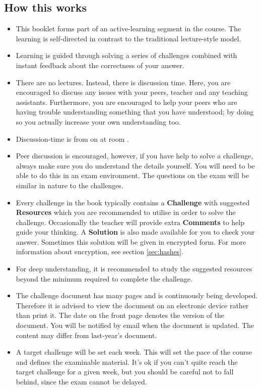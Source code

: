 \subsection{How this works}
\begin{itemize}
    \item This booklet forms part of an active-learning segment in the course. The learning is self-directed in contrast to the traditional lecture-style model.
    \item Learning is guided through solving a series of challenges combined with instant feedback about the correctness of your answer.
    \item There are no lectures. Instead, there is discussion time. Here, you are encouraged to discuss any issues with your peers, teacher and any teaching assistants. Furthermore, you are encouraged to help your peers who are having trouble understanding something that you have understood; by doing so you actually increase your own understanding too.
    \item Discussion-time is from \disctime on \discdays at room \discroom.
    \item Peer discussion is encouraged, however, if you have help to solve a challenge, always make sure you do understand the details yourself. You will need to be able to do this in an exam environment. The questions on the exam will be similar in nature to the challenges.
    \item Every challenge in the book typically contains a \textbf{Challenge} with suggested \textbf{Resources} which you are recommended to utilise in order to solve the challenge. Occasionally the teacher will provide extra \textbf{Comments} to help guide your thinking. A \textbf{Solution} is also made available for you to check your answer. Sometimes this solution will be given in encrypted form. For more information about encryption, see section \ref{sec:hashes}.
    \item For deep understanding, it is recommended to study the suggested resources beyond the minimum required to complete the challenge.
    \item The challenge document has many pages and is continuously being developed. Therefore it is advised to view the document on an electronic device rather than print it. The date on the front page denotes the version of the document. You will be notified by email when the document is updated. The content may differ from last-year's document.
    \item A target challenge will be set each week. This will set the pace of the course and defines the examinable material. It's ok if you can't quite reach the target challenge for a given week, but you should be careful not to fall behind, since the exam cannot be delayed.

\end{itemize}
